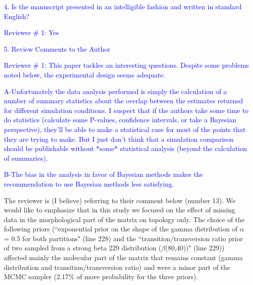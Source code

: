 \documentclass[11pt]{letter}
\begin{document}
\begin{letter}{}
\textcolor{blue}{4. Is the manuscript presented in an intelligible fashion and written in standard English?}

\textcolor{blue}{Reviewer $\#$ 1: Yes}

\textcolor{blue}{5. Review Comments to the Author}

\textcolor{blue}{Reviewer $\#$ 1: This paper tackles an interesting questions. Despite some problems noted below, the experimental design seems adequate.}


\textcolor{blue}{A-Unfortunately the data analysis performed is simply the calculation of a number of summary statistics about the overlap between the estimates returned for different simulation conditions. I suspect that if the authors take some time to do statistics (calculate some P-values, confidence intervals, or take a Bayesian perspective), they'll be able to make a statistical case for most of the points that they are trying to make. But I just don't think that a simulation comparison should be publishable without *some* statistical analysis (beyond the calculation of summaries).}




\textcolor{blue}{B-The bias in the analysis in favor of Bayesian methods makes the recommendation to use Bayesian methods less satisfying.}


The reviewer is (I believe) referring to their comment below (number 13). We would like to emphasize that in this study we focused on the effect of missing data in the morphological part of the matrix on topology only. The choice of the following priors (``exponential prior on the shape of the gamma distribution of $\alpha$ = 0.5 for both partitions" (line 228) and the ``transition/transversion ratio prior of two sampled from a strong beta 229 distribution ($\beta$(80,40))" (line 229)) affected mainly the molecular part of the matrix that remains constant (gamma distribution and transition/transversion ratio) and were a minor part of the MCMC sampler (2.17\% of move probability%
 for the three priors). 


\end{letter}
\end{document}
